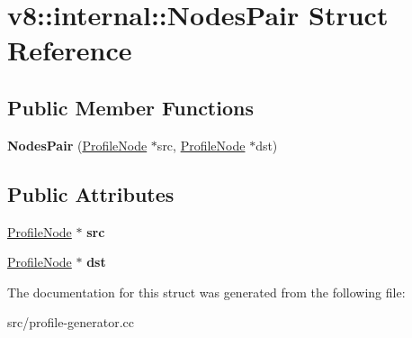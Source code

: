 \hypertarget{structv8_1_1internal_1_1_nodes_pair}{}\section{v8\+:\+:internal\+:\+:Nodes\+Pair Struct Reference}
\label{structv8_1_1internal_1_1_nodes_pair}
\subsection*{Public Member Functions}
\begin{DoxyCompactItemize}
\item 
\hypertarget{structv8_1_1internal_1_1_nodes_pair_acd47c7f1d3d29910685ce606408efed1}{}{\bfseries Nodes\+Pair} (\hyperlink{classv8_1_1internal_1_1_profile_node}{Profile\+Node} $\ast$src, \hyperlink{classv8_1_1internal_1_1_profile_node}{Profile\+Node} $\ast$dst)\label{structv8_1_1internal_1_1_nodes_pair_acd47c7f1d3d29910685ce606408efed1}

\end{DoxyCompactItemize}
\subsection*{Public Attributes}
\begin{DoxyCompactItemize}
\item 
\hypertarget{structv8_1_1internal_1_1_nodes_pair_a147e83f2b5cbaa40ab7bc1db39e28d05}{}\hyperlink{classv8_1_1internal_1_1_profile_node}{Profile\+Node} $\ast$ {\bfseries src}\label{structv8_1_1internal_1_1_nodes_pair_a147e83f2b5cbaa40ab7bc1db39e28d05}

\item 
\hypertarget{structv8_1_1internal_1_1_nodes_pair_a4fc530ce954145188fd801d556b71804}{}\hyperlink{classv8_1_1internal_1_1_profile_node}{Profile\+Node} $\ast$ {\bfseries dst}\label{structv8_1_1internal_1_1_nodes_pair_a4fc530ce954145188fd801d556b71804}

\end{DoxyCompactItemize}


The documentation for this struct was generated from the following file\+:\begin{DoxyCompactItemize}
\item 
src/profile-\/generator.\+cc\end{DoxyCompactItemize}
